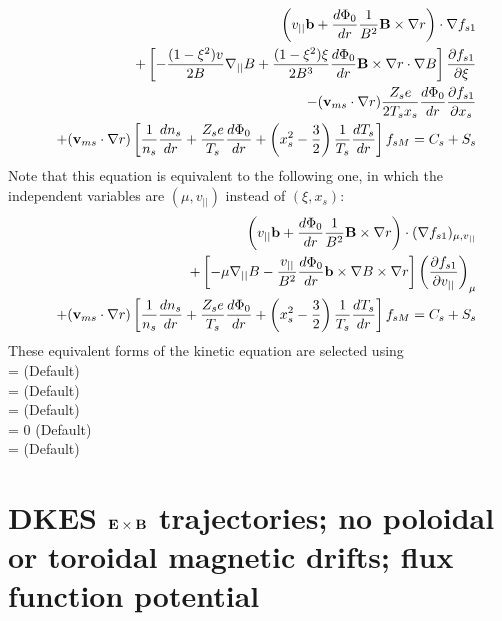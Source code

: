 \begin{eqnarray}
&&\left(v_{||}{\mathbf b} + \frac{d\Phi_0}{dr} \frac{1}{B^2} {\mathbf B}\times\nabla r \right) \cdot \nabla f_{s1} \\
&&+ \left[ - \frac{(1-\xi^2)v}{2B} \nabla_{||} B
+\frac{(1-\xi^2)\xi}{2B^3} \frac{d\Phi_0}{dr}{\mathbf B}\times\nabla r\cdot\nabla B \right]
 \frac{\partial f_{s1}}{\partial \xi} \nonumber \\
&&-({\mathbf v}_{ms} \cdot\nabla r) \frac{Z_s e}{2 T_s x_s} \frac{d\Phi_0}{dr} \frac{\partial f_{s1}}{\partial x_s} \nonumber \\
&&+ ({\mathbf v}_{ms} \cdot \nabla r) \left[ \frac{1}{n_s} \frac{dn_s}{dr} + \frac{Z_s e}{T_s} \frac{d\Phi_0}{dr} + \left(x_s^2-\frac{3}{2}\right) \frac{1}{T_s} \frac{dT_s}{dr}\right] f_{sM}
 = C_s + S_s \nonumber
\end{eqnarray}
Note that this equation is equivalent to the following one, in which the independent variables
are $(\mu,v_{||})$ instead of $(\xi,x_s)$:
\begin{eqnarray}
&&\left(v_{||}{\mathbf b} + \frac{d\Phi_0}{dr} \frac{1}{B^2} {\mathbf B}\times\nabla r \right) \cdot (\nabla f_{s1})_{\mu, v_{||}} \\
&&+ \left[ - \mu \nabla_{||} B
-\frac{v_{||}}{B^2} \frac{d\Phi_0}{dr} {\mathbf b}\times\nabla B \times \nabla r \right]
\left( \frac{\partial f_{s1}}{\partial v_{||}} \right)_{\mu} \nonumber \\
&& + ({\mathbf v}_{ms} \cdot \nabla r) \left[ \frac{1}{n_s} \frac{dn_s}{dr} + \frac{Z_s e}{T_s} \frac{d\Phi_0}{dr} + \left(x_s^2-\frac{3}{2}\right) \frac{1}{T_s} \frac{dT_s}{dr}\right] f_{sM}
=C_s + S_s \nonumber
\end{eqnarray}
These equivalent forms of the kinetic equation are selected using \\
 = \true  \;\;\; (Default) \\
 = \true \;\;\; (Default) \\
 = \false \;\;\; (Default) \\
 = 0 \;\;\; (Default) \\
 = \false \;\;\; (Default) %




\section{DKES ${\mathbf E}\times{\mathbf B}$ trajectories; no poloidal or toroidal magnetic drifts; flux function potential}

